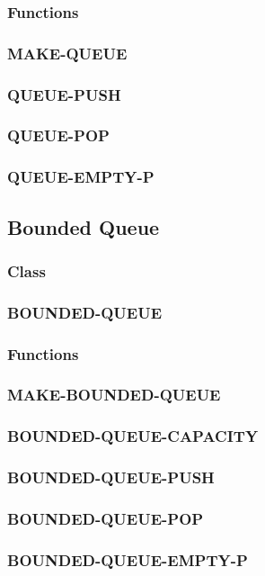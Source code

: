\documentclass[12pt, letterpaper]{article}
\begin{document}
	\subsubsection*{Functions}
	\subsubsection{MAKE-QUEUE}
	\subsubsection{QUEUE-PUSH}
	\subsubsection{QUEUE-POP}
	\subsubsection{QUEUE-EMPTY-P}
	
	\subsection{Bounded Queue}
	\subsubsection*{Class}
	\subsubsection{BOUNDED-QUEUE}
	\subsubsection*{Functions}
	\subsubsection{MAKE-BOUNDED-QUEUE}
	\subsubsection{BOUNDED-QUEUE-CAPACITY}
	\subsubsection{BOUNDED-QUEUE-PUSH}
	\subsubsection{BOUNDED-QUEUE-POP}
	\subsubsection{BOUNDED-QUEUE-EMPTY-P}
\end{document}
